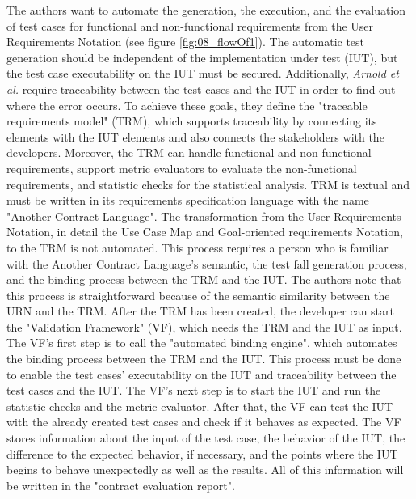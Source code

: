 The authors want to automate the generation, the execution, and the evaluation of test cases for functional and non-functional requirements from the User Requirements Notation (see figure \ref{fig:08_flowOf1}). The automatic test generation should be independent of the implementation under test (IUT), but the test case executability on the IUT must be secured. Additionally, \textit{Arnold et al.} require traceability between the test cases and the IUT in order to find out where the error occurs. To achieve these goals, they define the "traceable requirements model" (TRM), which supports traceability by connecting its elements with the IUT elements and also connects the stakeholders with the developers. Moreover, the TRM can handle functional and non-functional requirements, support metric evaluators to evaluate the non-functional requirements, and statistic checks for the statistical analysis. TRM is textual and must be written in its requirements specification language with the name "Another Contract Language". The transformation from the User Requirements Notation, in detail the Use Case Map and Goal-oriented requirements Notation, to the TRM is not automated. This process requires a person who is familiar with the Another Contract Language's semantic, the test fall generation process, and the binding process between the TRM and the IUT. The authors note that this process is straightforward because of the semantic similarity between the URN and the TRM. After the TRM has been created, the developer can start the "Validation Framework" (VF), which needs the TRM and the IUT as input. The VF's first step is to call the "automated binding engine", which automates the binding process between the TRM and the IUT. This process must be done to enable the test cases' executability on the IUT and traceability between the test cases and the IUT. The VF's next step is to start the IUT and run the statistic checks and the metric evaluator. After that, the VF can test the IUT with the already created test cases and check if it behaves as expected. The VF stores information about the input of the test case, the behavior of the IUT, the difference to the expected behavior, if necessary, and the points where the IUT begins to behave unexpectedly as well as the results. All of this information will be written in the "contract evaluation report".

